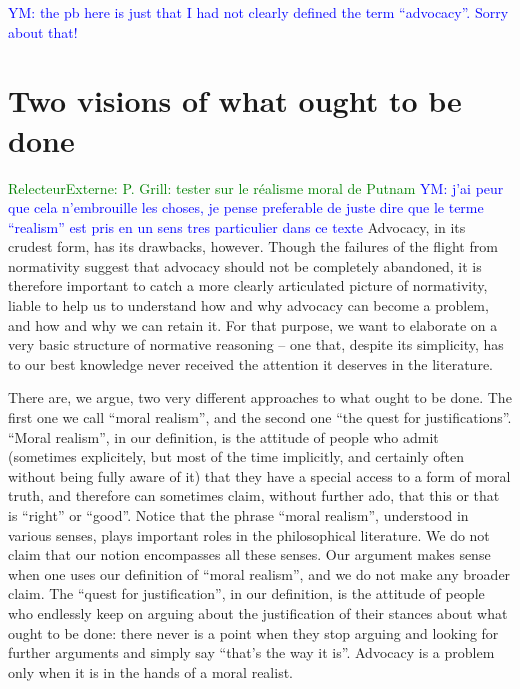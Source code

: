\documentclass[preprint,11pt]{elsarticle}
\newcommand{\commentYM}[1]{\textcolor{blue}{YM: #1}}
\newcommand{\commentE}[1]{\textcolor{green}{RelecteurExterne: #1}}
\begin{document}
\commentYM{the pb here is just that I had not clearly defined the term ``advocacy''. Sorry about that!}



\section{Two visions of what ought to be done}
\commentE{P. Grill: tester sur le réalisme moral de Putnam}
\commentYM{j'ai peur que cela n'embrouille les choses, je pense preferable de juste dire que le terme ``realism'' est pris en un sens tres particulier dans ce texte}
\noindent Advocacy, in its crudest form, has its drawbacks, however. Though the failures of the flight from normativity suggest that advocacy should not be completely abandoned, it is therefore important to catch a more clearly articulated picture of normativity, liable to help us to understand how and why advocacy can become a problem, and how and why we can retain it. For that purpose, we want to elaborate on a very basic structure of normative reasoning -- one that, despite its simplicity, has to our best knowledge never received the attention it deserves in the literature.

There are, we argue, two very different approaches to what ought to be done. The first one we call ``moral realism'', and the second one ``the quest for justifications''.
``Moral realism'', in our definition, is the attitude of people who admit (sometimes explicitely, but most of the time implicitly, and certainly often without being fully aware of it) that they have a special access to a form of moral truth, and therefore can sometimes claim, without further ado, that this or that is ``right'' or ``good''. Notice that the phrase ``moral realism'', understood in various senses, plays important roles in the philosophical literature. We do not claim that our notion encompasses all these senses. Our argument makes sense when one uses our definition of ``moral realism'', and we do not make any broader claim. The ``quest for justification'', in our definition, is the attitude of people who endlessly keep on arguing about the justification of their stances about what ought to be done: there never is a point when they stop arguing and looking for further arguments and simply say ``that's the way it is''. Advocacy is a problem only when it is in the hands of a moral realist.
\end{document}
